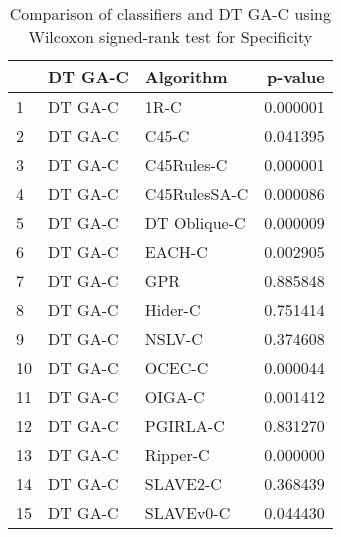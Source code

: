 \begin{table}
\footnotesize
\caption{Comparison of classifiers and DT GA-C using Wilcoxon signed-rank test for Specificity}
\label{tab:DT GA-C wilcoxon Specificity comparison}
\begin{tabular}{lllr}
\hline
 & DT GA-C & Algorithm & p-value \\
\hline
1 & DT GA-C & 1R-C & 0.000001 \\
2 & DT GA-C & C45-C & 0.041395 \\
3 & DT GA-C & C45Rules-C & 0.000001 \\
4 & DT GA-C & C45RulesSA-C & 0.000086 \\
5 & DT GA-C & DT Oblique-C & 0.000009 \\
6 & DT GA-C & EACH-C & 0.002905 \\
7 & DT GA-C & GPR & 0.885848 \\
8 & DT GA-C & Hider-C & 0.751414 \\
9 & DT GA-C & NSLV-C & 0.374608 \\
10 & DT GA-C & OCEC-C & 0.000044 \\
11 & DT GA-C & OIGA-C & 0.001412 \\
12 & DT GA-C & PGIRLA-C & 0.831270 \\
13 & DT GA-C & Ripper-C & 0.000000 \\
14 & DT GA-C & SLAVE2-C & 0.368439 \\
15 & DT GA-C & SLAVEv0-C & 0.044430 \\
\hline
\end{tabular}
\end{table}
